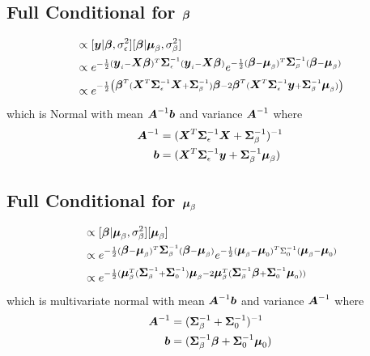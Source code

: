 \documentclass[fleqn]{article}
\def\bm#1{\mbox{\boldmath $#1$}}
\begin{document}
\subsection{Full Conditional for $\bm{\beta}$}
%
\begin{align*}
[\bm{\beta} | \cdot] & \propto [\bm{y} | \bm{\beta}, \sigma^2_\epsilon] [\bm{\beta} | \bm{\mu}_\beta, \sigma^2_\beta]\\
%
& \propto e^{ - \frac{1} {2} (\bm{y}_i - \bm{X} \bm{\beta})^T \bm{\Sigma}_\epsilon^{ - 1} (\bm{y}_i - \bm{X} \bm{\beta})} e^{ - \frac{1} {2} (\bm{\beta} - \bm{\mu}_\beta)^T \bm{\Sigma}_\beta^{ - 1} (\bm{\beta} - \bm{\mu}_\beta)}\\
%
& \propto e^{ - \frac{1} {2} \left( \bm{\beta}^T (\bm{X}^T \bm{\Sigma}_\epsilon^{ - 1} \bm{X} + \bm{\Sigma}_\beta^{ - 1}) \bm{\beta} - 2 \bm{\beta}^T (\bm{X}^T \bm{\Sigma}_\epsilon^{ - 1} \bm{y} + \bm{\Sigma}_\beta^{ - 1} \bm{\mu}_\beta) \right) }\\
\end{align*}
%
which is Normal with mean $ \bm{A}^{ - 1} \bm{b}$ and variance $\bm{A}^{ - 1}$ where
\begin{align*}
  \bm{A}^{ - 1} & = (\bm{X}^T \bm{\Sigma}_\epsilon^{ - 1} \bm{X} + \bm{\Sigma}_\beta^{ - 1})^{ - 1}\\
  \bm{b} & = (\bm{X}^T \bm{\Sigma}_{\epsilon}^{ - 1} \bm{y} + \bm{\Sigma}_\beta^{ - 1} \bm{\mu}_\beta)\\
\end{align*}
%
\subsection{Full Conditional for $\bm{\mu}_\beta$}
%
\begin{align*}
[\bm{\mu}_\beta | \cdot] & \propto [\bm{\beta} | \bm{\mu}_\beta, \sigma^2_\beta] [\bm{\mu}_\beta]\\
%
& \propto e^{ - \frac{1} {2} (\bm{\beta} - \bm{\mu}_\beta)^T \bm{\Sigma}_\beta^{ - 1} (\bm{\beta} - \bm{\mu}_\beta)} e^{ - \frac{1} {2} (\bm{\mu}_\beta - \bm{\mu}_0)^T \Sigma_0^{ - 1} (\bm{\mu}_\beta - \bm{\mu}_0)}\\
%
& \propto e^{ - \frac{1} {2} (
\bm{\mu}_\beta^T (\bm{\Sigma}_\beta^{ - 1} + \bm{\Sigma}_0^{ - 1}) \bm{\mu}_\beta - 2 \bm{\mu}_\beta^T (\bm{\Sigma}_\beta^{ - 1} \bm{\beta} + \bm{\Sigma}_0^{ - 1} \bm{\mu}_0) ) }
\end{align*}
%
which is multivariate normal with mean $\bm{A}^{ - 1} \bm{b}$ and variance $\bm{A}^{ - 1}$ where
\begin{align*}
\bm{A}^{ - 1} & = (\bm{\Sigma}_\beta^{ - 1} + \bm{\Sigma}_0^{ - 1})^{ - 1}\\
\bm{b} & =  
(\bm{\Sigma}_\beta^{ - 1} \bm{\beta} + \bm{\Sigma}_0^{ - 1} \bm{\mu}_0)
\end{align*}
%
\end{document}
